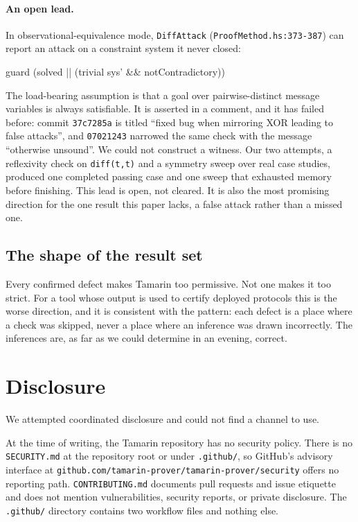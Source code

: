 \documentclass[version=preprint]{iacrcc}
\newcommand{\code}[1]{\texttt{\small #1}}
\theoremstyle{definition}
\theoremstyle{remark}
\begin{document}
\paragraph{An open lead.} In observational-equivalence mode, \code{DiffAttack}
(\code{ProofMethod.hs:373-387}) can report an attack on a constraint system it
never closed:

\begin{hslisting}
	guard (solved || (trivial sys' && notContradictory))
\end{hslisting}

The load-bearing assumption is that a goal over pairwise-distinct message
variables is always satisfiable. It is asserted in a comment, and it has failed
before: commit \code{37c7285a} is titled ``fixed bug when mirroring XOR leading
to false attacks'', and \code{07021243} narrowed the same check with the
message ``otherwise unsound''. We could not construct a witness. Our two
attempts, a reflexivity check on \code{diff(t,t)} and a symmetry sweep over
real case studies, produced one completed passing case and one sweep that
exhausted memory before finishing. This lead is open, not cleared. It is also
the most promising direction for the one result this paper lacks, a false
attack rather than a missed one.

\subsection{The shape of the result set}

Every confirmed defect makes Tamarin too permissive. Not one makes it too
strict. For a tool whose output is used to certify deployed protocols this is
the worse direction, and it is consistent with the pattern: each defect is a
place where a check was skipped, never a place where an inference was drawn
incorrectly. The inferences are, as far as we could determine in an evening,
correct.

\section{Disclosure}\label{sec:disclosure}

We attempted coordinated disclosure and could not find a channel to use.

At the time of writing, the Tamarin repository has no security policy. There is
no \code{SECURITY.md} at the repository root or under \code{.github/}, so
GitHub's advisory interface at
\code{github.com/tamarin-prover/tamarin-prover/security} offers no reporting
path. \code{CONTRIBUTING.md} documents pull requests and issue etiquette and
does not mention vulnerabilities, security reports, or private disclosure. The
\code{.github/} directory contains two workflow files and nothing else.
\end{document}

